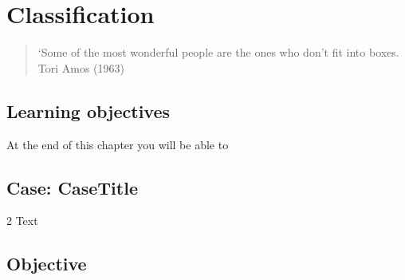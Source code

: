 
\chapter{Classification} %
\label{cha:classification}

\begin{quote}
`Some of the most wonderful people are the ones who don't fit into boxes.\\
Tori Amos (1963)
\end{quote}



\section*{Learning objectives}
At the end of this chapter you will be able to
\begin{compactitem}
\item 
\item 
\end{compactitem}





\begin{mdframed}[hidealllines=true,backgroundcolor=KPMG_blue!20]
\section*{Case: CaseTitle}
\begin{multicols}{2}
Text
\end{multicols}
\end{mdframed}

\section*{Objective}

